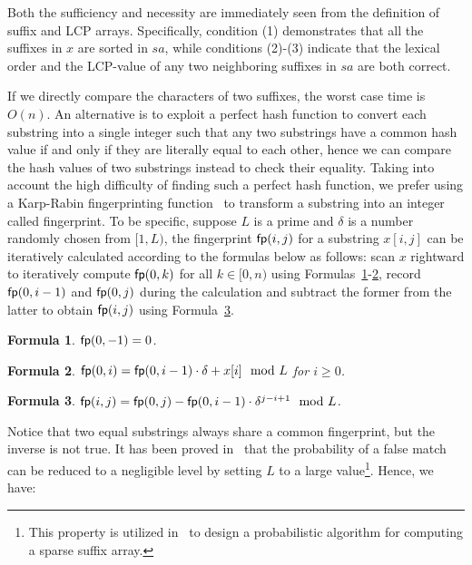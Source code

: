 \documentclass[10pt,journal,compsoc]{IEEEtran}
\newtheorem{Formula}{Formula}
\begin{document}
\begin{IEEEproof}
	Both the sufficiency and necessity are immediately seen from the definition of suffix and LCP arrays. Specifically, condition (1) demonstrates that all the suffixes in $x$ are sorted in $sa$, while conditions (2)-(3) indicate that the lexical order and the LCP-value of any two neighboring suffixes in $sa$ are both correct.
\end{IEEEproof}

If we directly compare the characters of two suffixes, the worst case time is $O(n)$. An alternative is to exploit a perfect hash function to convert each substring into a single integer such that any two substrings have a common hash value if and only if they are literally equal to each other, hence we can compare the hash values of two substrings instead to check their equality. Taking into account the high difficulty of finding such a perfect hash function, we prefer using a Karp-Rabin fingerprinting function~\cite{Karp1987} to transform a substring into an integer called fingerprint. To be specific, suppose $L$ is a prime and $\delta$ is a number randomly chosen from $[1, L)$, the fingerprint ${\sf fp}(i, j)$ for a substring $x[i, j]$ can be iteratively calculated according to the formulas below as follows: scan $x$ rightward to iteratively compute ${\sf fp}(0, k)$ for all $k \in [0, n)$ using Formulas~\ref{formula:1}-\ref{formula:2}, record ${\sf fp}(0, i - 1)$ and ${\sf fp}(0, j)$ during the calculation and subtract the former from the latter to obtain ${\sf fp}(i, j)$ using Formula~\ref{formula:3}.


\begin{Formula} \label{formula:1}
	${\sf fp}(0, -1) = 0$.
	
\end{Formula}

\begin{Formula} \label{formula:2}	
	${\sf fp}(0, i) = {\sf fp}(0, i - 1) \cdot {\delta} + x[i]\mod L$ for $i \ge 0$.
	
\end{Formula}

\begin{Formula} \label{formula:3}
	${\sf fp}(i, j) = {\sf fp}(0, j) - {\sf fp}(0 ,i - 1) \cdot {\delta}^{j - i + 1}\mod L$.
	
\end{Formula}


Notice that two equal substrings always share a common fingerprint, but the inverse is not true. It has been proved in~\cite{Karp1987} that the probability of a false match can be reduced to a negligible level by setting $L$ to a large value\footnote{This property is utilized in~\cite{Bille2013} to design a probabilistic algorithm for computing a sparse suffix array.}. Hence, we have:
\end{document}
